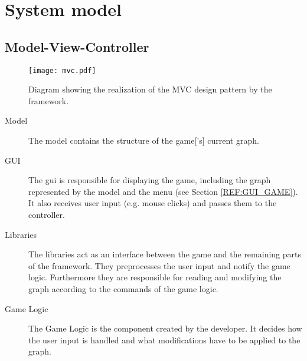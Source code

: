 \section{System model}

\subsection{Model-View-Controller}


\begin{figure}[h]
	\centering
	\texttt{[image: mvc.pdf]}
	\caption{Diagram showing the realization of the \gls{MVC} design pattern by the framework.}
	\label{img:MVC}
\end{figure}

\begin{description}
\item[Model] The model contains the structure of the \gls{game}['s] current \gls{graph}.
\item[GUI] The \gls{gui} is responsible for displaying the game, including the \gls{graph} represented by the model and the menu (see Section \ref{REF:GUI_GAME}). It also receives user input (e.g. mouse clicks) and passes them to the controller.
\item[Libraries] The libraries act as an interface between the game and the remaining parts of the framework. They preprocesses the user input and notify the game logic. Furthermore they are responsible for reading and modifying the \gls{graph} according to the commands of the game logic.
\item[Game Logic] The Game Logic is the component created by the \gls{developer}. It decides how the user input is handled and what modifications have to be applied to the \gls{graph}.
\end{description}